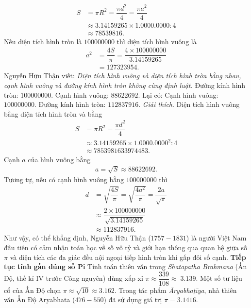 \begin{multicols}{2}
	\setlength{\abovedisplayskip}{7pt}
	\setlength{\belowdisplayskip}{7pt}
	\begin{align*}
			S &= \pi {R^2} = \dfrac{{\pi {d^2}}}{4} = \dfrac{{\pi {a^2}}}{4}\\
			&\approx 3.14159265 \times 1.0000.0000:4 \\
			&\approx 78539816.	
	\end{align*}
	Nếu diện tích hình tròn là $100000000$ thì diện tích hình vuông là
	\begin{align*}
		{a^2} &= \dfrac{{4S}}{\pi } = \dfrac{{4 \times 100000000}}{{3.14159265}}\\ &= 127323954.
	\end{align*}
	Nguyễn Hữu Thận viết:  \textit{Diện tích hình vuông và diện tích hình tròn bằng nhau, cạnh hình vuông và đường kính hình tròn không cùng định luật.}
	\vskip 0.1cm
	Đường kính hình tròn: $100000000$.
	\vskip 0.1cm 
	Cạnh hình vuông: $88622692$.
	\vskip 0.1cm
	Lại có: 
	\vskip 0.1cm
	Cạnh hình vuông: $100000000$.
	\vskip 0.1cm 
	Đường kính hình tròn: $112837916$.
	\vskip 0.1cm
	\textit{Giải thích}. Diện tích hình vuông bằng diện tích hình tròn và bằng 
	\begin{align*}
		S &= \pi {R^2} = \dfrac{{\pi {d^2}}}{4}\\
		&\approx 3.14159265 \times {1.0000.0000^2}:4 \\
		&\approx 7853981633974483.
	\end{align*}
	Cạnh $a$ của hình vuông bằng
	\begin{align*}
		a = \sqrt S  \approx 88622692.
	\end{align*}
	Tương tự, nếu có cạnh hình vuông bằng $100000000$ thì  
	\begin{align*}
		d &= \sqrt {\dfrac{{4S}}{\pi }}  = \sqrt {\dfrac{{4{a^2}}}{\pi }}  = \dfrac{{2a}}{{\sqrt \pi  }} \\
		&\approx \dfrac{{2 \times 100000000}}{{\sqrt {3.14159265} }} \\
		&\approx 112837916.
	\end{align*}
	Như vậy, có thể khẳng định, Nguyễn Hữu Thận ($1757-1831$) là người Việt Nam đầu tiên có cảm nhận toán học về số vô tỷ và giới hạn thông qua quan hệ giữa số $\pi$ và diện tích các đa giác đều nội ngoại tiếp hình tròn khi gấp đôi số cạnh.
	\vskip 0.1cm
	\textbf{\color{lichsutoanhoc}Tiếp tục tính gần đúng số Pi}
	\vskip 0.1cm
	Tính toán thiên văn trong \textit{Shatapatha Brahmana} (Ấn Độ, thế kỉ IV trước Công nguyên) dùng xấp xỉ $\pi  \approx \dfrac{{339}}{{108}} \approx \;3.139$.  Một số tư liệu cổ của Ấn Độ chọn $\pi  \approx \sqrt {10}  \approx 3.162$. Trong tác phẩm \textit{Āryabhaṭīya}, nhà thiên văn Ấn Độ Aryabhata ($476-550$) đã sử dụng giá trị $\pi  = 3.1416$.

\end{multicols}
